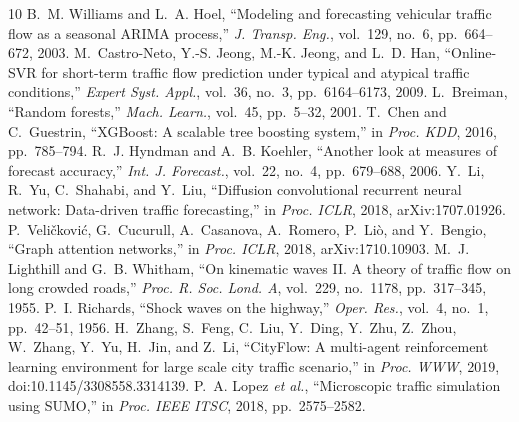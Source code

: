 \documentclass[conference]{IEEEtran}
\begin{document}
\begin{thebibliography}{10}
 B.~M. Williams and L.~A. Hoel, ``Modeling and forecasting vehicular traffic flow as a seasonal ARIMA process,'' \emph{J. Transp. Eng.}, vol.~129, no.~6, pp.~664--672, 2003.
 M.~Castro-Neto, Y.-S. Jeong, M.-K. Jeong, and L.~D. Han, ``Online-SVR for short-term traffic flow prediction under typical and atypical traffic conditions,'' \emph{Expert Syst. Appl.}, vol.~36, no.~3, pp.~6164--6173, 2009.
 L.~Breiman, ``Random forests,'' \emph{Mach. Learn.}, vol.~45, pp.~5--32, 2001.
 T.~Chen and C.~Guestrin, ``XGBoost: A scalable tree boosting system,'' in \emph{Proc. KDD}, 2016, pp.~785--794.
 R.~J. Hyndman and A.~B. Koehler, ``Another look at measures of forecast accuracy,'' \emph{Int. J. Forecast.}, vol.~22, no.~4, pp.~679--688, 2006.
 Y.~Li, R.~Yu, C.~Shahabi, and Y.~Liu, ``Diffusion convolutional recurrent neural network: Data-driven traffic forecasting,'' in \emph{Proc. ICLR}, 2018, arXiv:1707.01926.
 P.~Veli\v{c}kovi\'{c}, G.~Cucurull, A.~Casanova, A.~Romero, P.~Li\`{o}, and Y.~Bengio, ``Graph attention networks,'' in \emph{Proc. ICLR}, 2018, arXiv:1710.10903.
 M.~J. Lighthill and G.~B. Whitham, ``On kinematic waves II. A theory of traffic flow on long crowded roads,'' \emph{Proc. R. Soc. Lond. A}, vol.~229, no.~1178, pp.~317--345, 1955.
 P.~I. Richards, ``Shock waves on the highway,'' \emph{Oper. Res.}, vol.~4, no.~1, pp.~42--51, 1956.
 H.~Zhang, S.~Feng, C.~Liu, Y.~Ding, Y.~Zhu, Z.~Zhou, W.~Zhang, Y.~Yu, H.~Jin, and Z.~Li, ``CityFlow: A multi-agent reinforcement learning environment for large scale city traffic scenario,'' in \emph{Proc. WWW}, 2019, doi:10.1145/3308558.3314139.
 P.~A. Lopez \emph{et al.}, ``Microscopic traffic simulation using SUMO,'' in \emph{Proc. IEEE ITSC}, 2018, pp.~2575--2582.
\end{thebibliography}
\end{document}
